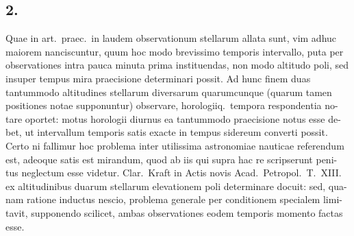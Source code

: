 \documentclass[12pt,a4paper]{article}
\begin{document}
\subsection*{2.}

Quae in art.\ praec.\ in laudem observationum stellarum allata sunt, vim
adhuc maiorem nanciscuntur, quum hoc modo brevissimo temporis intervallo,
puta per observationes intra pauca minuta prima instituendas, non modo altitudo
poli, sed insuper tempus mira praecisione determinari possit. Ad hunc finem
duas tantummodo altitudines stellarum diversarum quarumcunque (quarum tamen
positiones notae supponuntur) observare, horologiiq.\ tempora respondentia no-
tare oportet: motus horologii diurnus ea tantummodo praecisione notus esse de-
bet, ut intervallum temporis satis exacte in tempus sidereum converti possit.
Certo ni fallimur hoc problema inter utilissima astronomiae nauticae referendum
est, adeoque satis est mirandum, quod ab iis qui supra hac re scripserunt peni-
tus neglectum esse videtur. Clar.\ Kraft in Actis novis Acad.\ Petropol.\ T.~XIII.
ex altitudinibus duarum stellarum elevationem poli determinare docuit: sed, qua-
nam ratione inductus nescio, problema generale per conditionem specialem limi-
tavit, supponendo scilicet, ambas observationes eodem temporis momento factas
esse.
\end{document}
